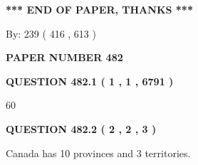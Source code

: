 \documentclass[12pt]{article}
\begin{document}
 
 
 
   
   
 \vspace{0.2in}
 
   
   
   
   
\vspace{1.0in} 
{\textbf{\large{ *** END OF PAPER, THANKS *** }}} 
   
   
\hspace{1.0in} By: 
 239 ( 416 ,  613 )
   
   
   
   
\newpage 
\setcounter{page}{ 
   482001 } 
   
   
   
   
 {\textbf{ \Large{ PAPER NUMBER  482  }}}
   
   
\vspace{0.2in}
   
   
   
   
   
   
 \vspace{0.2in}
 
 
 
 
   
   
  
\vspace{0.2in}
  
{\textbf{\Large{QUESTION
482.1 
 ( 1 , 1 , 6791 )
}}}
  
  
 
 
\noindent{}

60
 
 
  
\vspace{0.2in}
  
{\textbf{\Large{QUESTION
482.2 
 ( 2 , 2 , 3 )
}}}
  
  
 
 
\noindent{}
 
 
Canada has 10  provinces and 3 territories.
 
 
 
 
   
   
 \vspace{0.2in}
 
   
   
\end{document}
